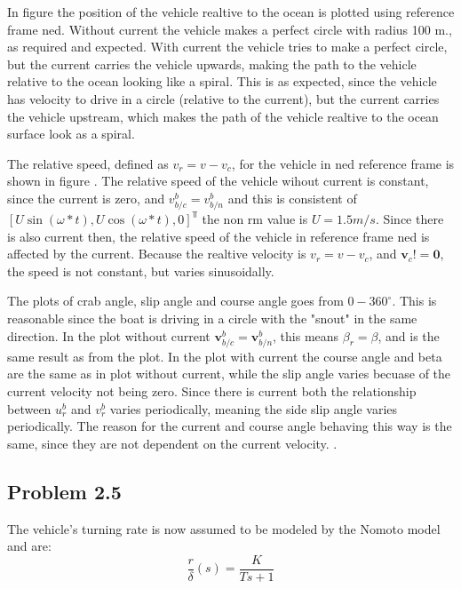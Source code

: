 In figure  the position of the vehicle realtive to the ocean is plotted using reference frame ned. Without current the vehicle makes a perfect circle with radius 100 m., as required and expected. With current the vehicle tries to make a perfect circle, but the current carries the vehicle upwards, making the path to the vehicle relative to  the ocean looking like a spiral. This is as expected, since the vehicle has velocity to drive in a circle (relative to the current), but the current carries the vehicle upstream, which makes the path of the vehicle realtive to the ocean surface look as a spiral.

The relative speed, defined as $v_r = v - v_c$, for the vehicle in ned reference frame is shown in figure . The relative speed of the vehicle wihout current is constant, since the current is zero, and $v^b_{b/c}=v^b_{b/n}$ and this is consistent of $[U \sin(\omega *t), U \cos(\omega*t),0]^\Top$ the non rm value is $U = 1.5 m/s$. Since there is also current then, the relative speed of the vehicle in reference frame ned is affected by the current. Because the realtive velocity is $v_r = v - v_c$, and $\mathbf{v}_c != \mathbf{0}$, the speed is not constant, but varies sinusoidally. 

The plots of crab angle, slip angle and course angle goes from $0-360^\circ$. This is reasonable since the boat is driving in a circle with the "snout"  in the same direction. In the plot without current $\mathbf{v}^b_{b/c} = \mathbf{v}^b_{b/n} $, this means $\beta_r = \beta$, and is the same result as from the plot. In the plot with current the course angle and beta are the same as in plot without current, while the slip angle varies becuase of the current velocity not being zero. Since there is current both the relationship between $u^b_r$ and $v^b_r$ varies periodically, meaning the side slip angle varies periodically. The reason for the current and course angle behaving this way is the same, since they are not dependent on the current velocity.  .

\subsection*{Problem 2.5}

The vehicle's turning rate is now assumed to be modeled by the Nomoto model and are:
\begin{equation}
	\frac{r}{\delta} (s) = \frac{K}{Ts+1}
\end{equation}

